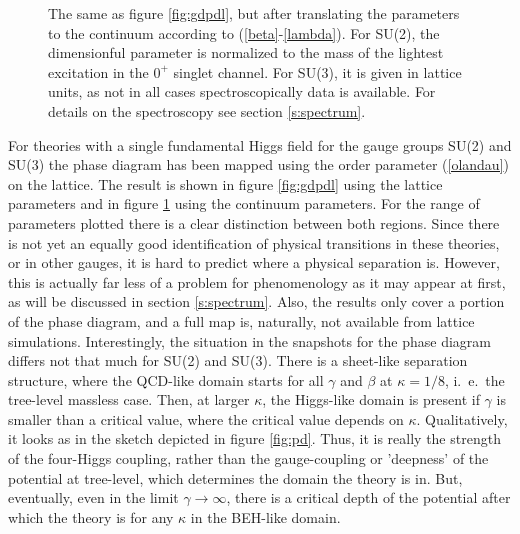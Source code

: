\documentclass[final,12pt]{article}
\newcommand*{\pref}[1]{(\ref{#1})}
\newcommand*{\prefr}[2]{(\ref{#1}-\ref{#2})}
\newcommand*{\1}{1\!\!\!\bot}
\begin{document}
\begin{figure}[!htbp]
\begin{minipage}{0.7\linewidth}
\end{minipage}
\begin{minipage}{0.3\linewidth}
\caption{\label{fig:gdpdc}The same as figure \ref{fig:gdpdl}, but after translating the parameters to the continuum according to \prefr{beta}{lambda}. For SU(2), the dimensionful parameter is normalized  to the mass of the lightest excitation in the $0^+$ singlet channel. For SU(3), it is given in lattice units, as not in all cases spectroscopically data is available. For details on the spectroscopy see section \ref{s:spectrum}.}
\end{minipage}
\end{figure}

For theories with a single fundamental Higgs field for the gauge groups SU(2) \cite{Maas:2014pba} and SU(3) \cite{Maas:2016ngo} the phase diagram has been mapped using the order parameter \pref{olandau} on the lattice. The result is shown in figure \ref{fig:gdpdl} using the lattice parameters and in figure \ref{fig:gdpdc} using the continuum parameters. For the range of parameters plotted there is a clear distinction between both regions. Since there is not yet an equally good identification of physical transitions in these theories, or in other gauges, it is hard to predict where a physical separation is. However, this is actually far less of a problem for phenomenology as it may appear at first, as will be discussed in section \ref{s:spectrum}. Also, the results only cover a portion of the phase diagram, and a full map is, naturally, not available from lattice simulations. Interestingly, the situation in the snapshots for the phase diagram differs not that much for SU(2) and SU(3). There is a sheet-like separation structure, where the QCD-like domain starts for all $\gamma$ and $\beta$ at $\kappa=1/8$, i.\ e.\ the tree-level massless case. Then, at larger $\kappa$, the Higgs-like domain is present if $\gamma$ is smaller than a critical value, where the critical value depends on $\kappa$. Qualitatively, it looks as in the sketch depicted in figure \ref{fig:pd}. Thus, it is really the strength of the four-Higgs coupling, rather than the gauge-coupling or 'deepness' of the potential at tree-level, which determines the domain the theory is in. But, eventually, even in the limit $\gamma\to\infty$, there is a critical depth of the potential after which the theory is for any $\kappa$ in the BEH-like domain.
\end{document}
